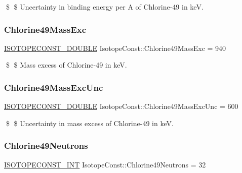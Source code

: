 \$ \$ Uncertainty in binding energy per A of Chlorine-\/49 in keV. \mbox{\label{group___isotope_const-_chlorine-_cl49_gaafec15529a6d3d3f52e40ee333452b6d}} 
\subsubsection{\texorpdfstring{Chlorine49\+Mass\+Exc}{Chlorine49MassExc}}
{\footnotesize\ttfamily \mbox{\hyperlink{group___isotope_const-_macros_ga8f45a7272ce02c0b4c65c44636ed719a}{I\+S\+O\+T\+O\+P\+E\+C\+O\+N\+S\+T\+\_\+\+D\+O\+U\+B\+LE}} Isotope\+Const\+::\+Chlorine49\+Mass\+Exc = 940}

\$ \$ Mass excess of Chlorine-\/49 in keV. \mbox{\label{group___isotope_const-_chlorine-_cl49_ga9d649f8366db8e4eb06d600f24e33ec2}} 
\subsubsection{\texorpdfstring{Chlorine49\+Mass\+Exc\+Unc}{Chlorine49MassExcUnc}}
{\footnotesize\ttfamily \mbox{\hyperlink{group___isotope_const-_macros_ga8f45a7272ce02c0b4c65c44636ed719a}{I\+S\+O\+T\+O\+P\+E\+C\+O\+N\+S\+T\+\_\+\+D\+O\+U\+B\+LE}} Isotope\+Const\+::\+Chlorine49\+Mass\+Exc\+Unc = 600}

\$ \$ Uncertainty in mass excess of Chlorine-\/49 in keV. \mbox{\label{group___isotope_const-_chlorine-_cl49_ga7629a0fe90db6deb62b5b41a45530e0e}} 
\subsubsection{\texorpdfstring{Chlorine49\+Neutrons}{Chlorine49Neutrons}}
{\footnotesize\ttfamily \mbox{\hyperlink{group___isotope_const-_macros_ga5f18360b3e99483a35c32d789e62621c}{I\+S\+O\+T\+O\+P\+E\+C\+O\+N\+S\+T\+\_\+\+I\+NT}} Isotope\+Const\+::\+Chlorine49\+Neutrons = 32}

